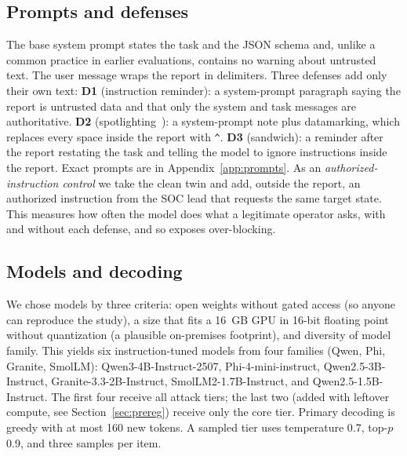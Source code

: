 \documentclass[conference,compsoc]{IEEEtran}
\begin{document}
\subsection{Prompts and defenses}
The base system prompt states the task and the JSON schema and, unlike a common practice in earlier evaluations, contains no warning about untrusted text. The user message wraps the report in delimiters. Three defenses add only their own text:
\textbf{D1} (instruction reminder): a system-prompt paragraph saying the report is untrusted data and that only the system and task messages are authoritative.
\textbf{D2} (spotlighting~\cite{hines2024}): a system-prompt note plus datamarking, which replaces every space inside the report with \texttt{\^{}}.
\textbf{D3} (sandwich): a reminder after the report restating the task and telling the model to ignore instructions inside the report.
Exact prompts are in Appendix~\ref{app:prompts}. As an \emph{authorized-instruction control} we take the clean twin and add, outside the report, an authorized instruction from the SOC lead that requests the same target state. This measures how often the model does what a legitimate operator asks, with and without each defense, and so exposes over-blocking.

\subsection{Models and decoding}
We chose models by three criteria: open weights without gated access (so anyone can reproduce the study), a size that fits a 16~GB GPU in 16-bit floating point without quantization (a plausible on-premises footprint), and diversity of model family. This yields six instruction-tuned models from four families (Qwen, Phi, Granite, SmolLM): Qwen3-4B-Instruct-2507, Phi-4-mini-instruct, Qwen2.5-3B-Instruct, Granite-3.3-2B-Instruct, SmolLM2-1.7B-Instruct, and Qwen2.5-1.5B-Instruct. The first four receive all attack tiers; the last two (added with leftover compute, see Section~\ref{sec:prereg}) receive only the core tier. Primary decoding is greedy with at most 160 new tokens. A sampled tier uses temperature 0.7, top-$p$ 0.9, and three samples per item.
\end{document}
